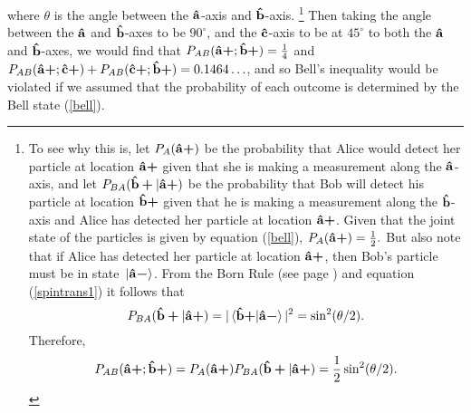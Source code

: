 \documentclass[letter, 12pt]{turabian-thesis}
\theoremstyle{hypothesis}
\newcommand{\uvb}[1]{\vb{\hat{{#1}}}}
\newcommand{\uvbp}[1]{\uvb{#1}\bm{+}}
\newcommand{\uvbm}[1]{\uvb{#1}\bm{-}}
\let\origfootnote\footnote %
\renewcommand{\footnote}[1]{%
\noindent %
\origfootnote{#1}}
\begin{document}
where $\theta$ is the angle between the $\uvb{a}$-axis and $\uvb{b}$-axis.\footnote{To see why this is, let $P_A(\uvbp{a})$ be the probability that Alice would detect her particle at location $\uvbp{a}$ given that she is making a measurement along the $\uvb{a}$-axis, and let $P_{BA}(\uvbp{b}|\uvbp{a})$ be the probability that Bob will detect his particle at location $\uvbp{b}$ given that he is making a measurement along the $\uvb{b}$-axis and Alice has detected her particle at location $\uvbp{a}$. Given that the joint state of the particles is given by equation (\ref{bell}), $P_A(\uvbp{a})=\frac{1}{2}.$ But also note that if  Alice has detected her particle at location  
$\uvbp{a}$, then Bob's particle must be in state $\ket*{\uvbm{a}}$. From the Born Rule (see page \pageref{bornrule}) and equation (\ref{spintrans1}) it follows that 
$$P_{BA}(\uvbp{b}|\uvbp{a})= |\ip*{\uvbp{b}}{\uvbm{a}}|^2=\sin^2(\theta/2).$$ 
Therefore, $$P_{AB}(\uvbp{a};\uvbp{b})= P_A(\uvbp{a})P_{BA}(\uvbp{b}|\uvbp{a})=\frac{1}{2}\sin^2(\theta/2).$$} Then taking the angle between the $\uvb{a}$ and $\uvb{b}$-axes to be $90^\circ$, and the $\uvb{c}$-axis to be at $45^\circ$ to both the $\uvb{a}$ and $\uvb{b}$-axes, we would find that $P_{AB}(\uvbp{a};\uvbp{b})=\frac{1}{4}$ and $P_{AB}(\uvbp{a};\uvbp{c})+P_{AB}(\uvbp{c};\uvbp{b})=0.1464\ldots$, and so Bell's inequality would be violated if we assumed that the probability of each outcome is determined by the Bell state  (\ref{bell}). 
\end{document}
